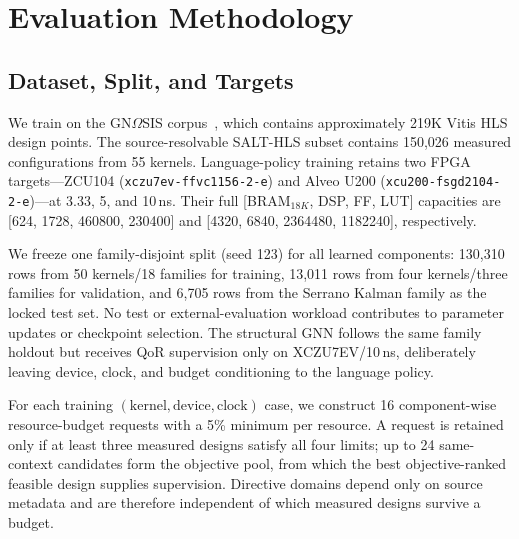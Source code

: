 \section{Evaluation Methodology}
\label{sec:evaluation-methodology}

\subsection{Dataset, Split, and Targets}
\label{subsec:eval-data}

We train on the GN$\Omega$SIS corpus~\cite{ferikoglou2026gnomegasis},
which contains approximately 219K Vitis HLS design points.
The source-resolvable SALT-HLS subset contains 150,026 measured
configurations from 55 kernels. Language-policy training retains two
FPGA targets---ZCU104 (\texttt{xczu7ev-ffvc1156-2-e}) and Alveo U200
(\texttt{xcu200-fsgd2104-2-e})---at 3.33, 5, and 10\,ns.
Their full [BRAM$_{18K}$, DSP, FF, LUT] capacities are
[624, 1728, 460800, 230400] and
[4320, 6840, 2364480, 1182240], respectively.

We freeze one family-disjoint split (seed 123) for all learned
components: 130,310 rows from 50 kernels/18 families for training,
13,011 rows from four kernels/three families for validation, and
6,705 rows from the Serrano Kalman family as the locked test set.
No test or external-evaluation workload contributes to parameter
updates or checkpoint selection. The structural GNN follows the same
family holdout but receives QoR supervision only on XCZU7EV/10\,ns,
deliberately leaving device, clock, and budget conditioning to the
language policy.

For each training $(\text{kernel},\text{device},\text{clock})$ case,
we construct 16 component-wise resource-budget requests with a 5\%
minimum per resource. A request is retained only if at least three
measured designs satisfy all four limits; up to 24 same-context
candidates form the objective pool, from which the best
objective-ranked feasible design supplies supervision. Directive
domains depend only on source metadata and are therefore independent
of which measured designs survive a budget.


